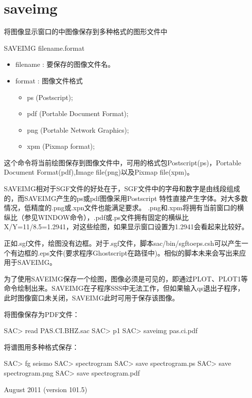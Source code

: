 \section{saveimg}
\label{cmd:saveimg}

将图像显示窗口的中图像保存到多种格式的图形文件中

SAVEIMG filename.format

\begin{itemize}
\item filename : 要保存的图像文件名。 
\item format : 图像文件格式
	\begin{itemize}
	\item ps  (Postscript); 
    \item pdf (Portable Document Format);
	\item png (Portable Network Graphics);
	\item xpm (Pixmap format);
	\end{itemize}
\end{itemize}

这个命令将当前绘图保存到图像文件中，可用的格式包Postscript(ps)，Portable Document Format(pdf),Image file(png)以及Pixmap file(xpm)。

SAVEIMG相对于SGF文件的好处在于，SGF文件中的字母和数字是由线段组成的，而SAVEIMG产生的ps或pdf图像采用Postscript 特性直接产生字体。对大多数情况，低精度的.png或.xpn文件也能满足要求。
.png和.xpm将拥有当前窗口的横纵比（参见WINDOW命令），.pdf或.ps文件拥有固定的横纵比X/Y=11/8.5=1.2941，对这些绘图，如果显示窗口设置为1.2941会看起来比较好。

正如.sgf文件，绘图没有边框。对于.sgf文件，脚本sac/bin/sgftoeps.csh可以产生一个有边框的.eps文件(要求程序Ghostscript在路径中)。相似的脚本未来会写出来应用于SAVEIMG。

为了使用SAVEIMG保存一个绘图，图像必须是可见的，即通过PLOT、PLOT1等命令绘制出来。SAVEIMG在子程序SSS中无法工作，但如果输入qs退出子程序，此时图像窗口未关闭，SAVEIMG此时可用于保存该图像。

将图像保存为PDF文件：
\begin{SACCode}
SAC> read PAS.CI.BHZ.sac
SAC> p1
SAC> saveimg pas.ci.pdf
\end{SACCode}

将谱图用多种格式保存：
\begin{SACCode}
SAC> fg seismo
SAC> spectrogram
SAC> save spectrogram.ps
SAC> save spectrogram.png
SAC> save spectrogram.pdf
\end{SACCode}

August 2011 (version 101.5) 

